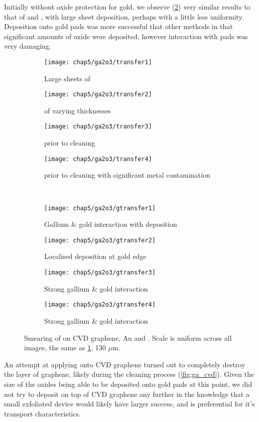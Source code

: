 \documentclass[../Matt_Gebert_Honours_Thesis.tex]{subfiles}
\begin{document}
	Initially without oxide protection for gold, we observe (\cref{fig:smear1}) very similar results to that of \bismuthoxide{} and \tinoxide{}, with large sheet deposition, perhaps with a little less uniformity. Deposition onto gold pads was more successful that other methods in that significant amounts of oxide were deposited, however interaction with pads was very damaging.
	\begin{figure}[H]
		\begin{subfigure}[t]{0.24\textwidth}
			\texttt{[image: chap5/ga2o3/transfer1]}
			\caption{Large sheets of \galliumoxide{}}\label{fig:smear1a}
		\end{subfigure}
		\begin{subfigure}[t]{0.24\textwidth}
			\texttt{[image: chap5/ga2o3/transfer2]}
			\caption{\galliumoxide{} of varying thicknesses}
		\end{subfigure}
		\begin{subfigure}[t]{0.24\textwidth}
			\texttt{[image: chap5/ga2o3/transfer3]}
			\caption{\galliumoxide{} prior to cleaning}
		\end{subfigure}
		\begin{subfigure}[t]{0.24\textwidth}
			\texttt{[image: chap5/ga2o3/transfer4]}
			\caption{\galliumoxide{} prior to cleaning with significant metal contamination}
		\end{subfigure}\\
		\begin{subfigure}[t]{0.24\textwidth}
			\texttt{[image: chap5/ga2o3/gtransfer1]}
			\caption{Gallium \& gold interaction with \galliumoxide{} deposition}
		\end{subfigure}
		\begin{subfigure}[t]{0.24\textwidth}
			\texttt{[image: chap5/ga2o3/gtransfer2]}
			\caption{Localised \galliumoxide{} deposition at gold edge}
		\end{subfigure}
		\begin{subfigure}[t]{0.24\textwidth}
			\texttt{[image: chap5/ga2o3/gtransfer3]}
			\caption{Strong gallium \& gold interaction}
		\end{subfigure}
		\begin{subfigure}[t]{0.24\textwidth}
			\texttt{[image: chap5/ga2o3/gtransfer4]}
			\caption{Strong gallium \& gold interaction}
		\end{subfigure}
		\caption[Smearing of \galliumoxide{} on CVD graphene, Au and \silicondioxide{}]{Smearing of \galliumoxide{} on CVD graphene, Au and \silicondioxide{}. Scale is uniform across all images, the same as \cref{fig:smear1a}, 130 $\mu$m.}\label{fig:smear1}
	\end{figure}
	An attempt at applying \galliumoxide{} onto CVD graphene turned out to completely destroy the layer of graphene, likely during the cleaning process (\cref{fig:ga_cvd}). Given the size of the oxides being able to be deposited onto gold pads at this point, we did not try to deposit on top of CVD graphene any further in the knowledge that a small exfoliated device would likely have larger success, and is preferential for it's transport characteristics.
\end{document}

